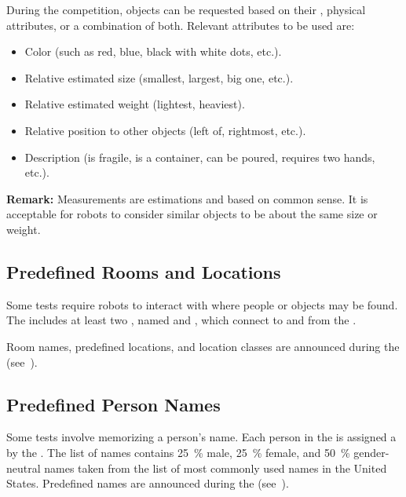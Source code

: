 During the competition, objects can be requested based on their \ObjectCategory{}, physical attributes, or a combination of both.
Relevant attributes to be used are:
\begin{itemize}
	\item Color (such as red, blue, black with white dots, etc.).
	\item Relative estimated size (smallest, largest, big one, etc.).
	\item Relative estimated weight (lightest, heaviest).
	\item Relative position to other objects (left of, rightmost, etc.).
	\item Description (is fragile, is a container, can be poured, requires two hands, etc.).
\end{itemize}

\noindent\textbf{Remark:} Measurements are estimations and based on common sense. It is acceptable for robots to consider similar objects to be about the same size or weight.

%
%

\subsection{Predefined Rooms and Locations}\label{rule:scenario_locations}

Some tests require robots to interact with \PredefinedLocation{} where people or objects may be found.
The \Arena{} includes at least two , named \Entrance{} and \Exit{}, which connect to and from the \Arena{}.

Room names, predefined locations, and location classes are announced during the \SetupDays{} (see~).

\subsection{Predefined Person Names}\label{rule:scenario_names}

Some tests involve memorizing a person's name.
Each person in the \Arena{} is assigned a \PredefinedName{} by the \TC{}.
The list of names contains \SI{25}{\percent} male, \SI{25}{\percent} female, and \SI{50}{\percent} gender-neutral names taken from the list of most commonly used names in the United States.
Predefined names are announced during the \SetupDays{} (see~).

